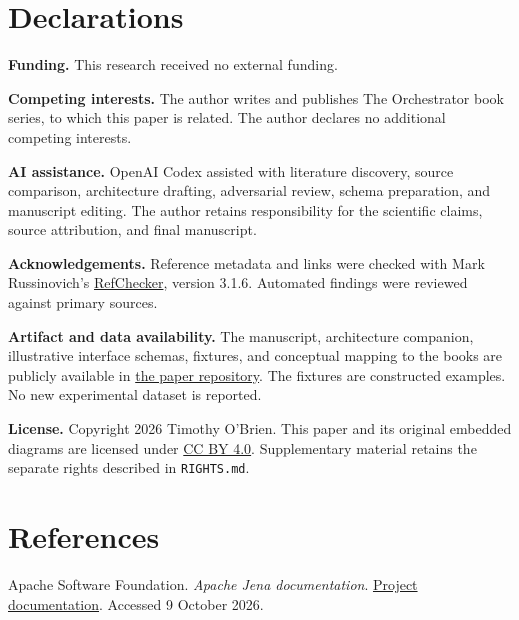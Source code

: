 \documentclass[preprint,12pt,authoryear]{elsarticle}
\begin{document}

\section*{Declarations}\label{declarations}

\textbf{Funding.} This research received no external funding.

\textbf{Competing interests.} The author writes and publishes The
Orchestrator book series, to which this paper is related. The author
declares no additional competing interests.

\textbf{AI assistance.} OpenAI Codex assisted with literature discovery,
source comparison, architecture drafting, adversarial review, schema
preparation, and manuscript editing. The author retains responsibility
for the scientific claims, source attribution, and final manuscript.

\textbf{Acknowledgements.} Reference metadata and links were checked
with Mark Russinovich's
\href{https://github.com/markrussinovich/refchecker}{RefChecker},
version 3.1.6. Automated findings were reviewed against primary sources.

\textbf{Artifact and data availability.} The manuscript, architecture
companion, illustrative interface schemas, fixtures, and conceptual
mapping to the books are publicly available in
\href{https://github.com/prosessleder/orchestrator-lifecycle}{the paper
repository}. The fixtures are constructed examples. No new experimental
dataset is reported.

\textbf{License.} Copyright 2026 Timothy O'Brien. This paper and its
original embedded diagrams are licensed under
\href{https://creativecommons.org/licenses/by/4.0/}{CC BY 4.0}.
Supplementary material retains the separate rights described in
\texttt{RIGHTS.md}.

\section*{References}\label{references}

\begingroup
\small
\setlength{\parindent}{-1.5em}
\setlength{\leftskip}{1.5em}
\setlength{\parskip}{3pt}

Apache Software Foundation. \emph{Apache Jena documentation}.
\href{https://jena.apache.org/documentation/}{Project documentation}.
Accessed 9 October 2026.
\end{document}
